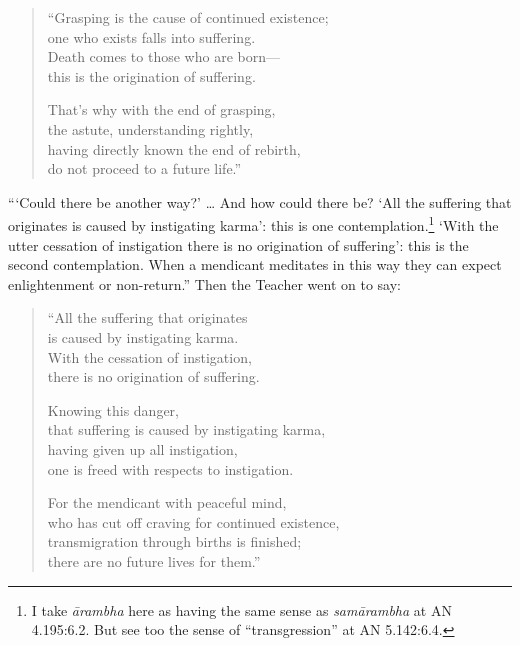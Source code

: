 \documentclass[12pt,openany]{book}%
\begin{document}
\begin{verse}%
“Grasping is the cause of continued existence; \\
one who exists falls into suffering. \\
Death comes to those who are born—\\
this is the origination of suffering. 

That’s why with the end of grasping, \\
the astute, understanding rightly, \\
having directly known the end of rebirth, \\
do not proceed to a future life.” 

%
\end{verse}

“‘Could there be another way?’ … And how could there be? ‘All the suffering that originates is caused by instigating karma’: this is one contemplation.\footnote{I take \textit{\textsanskrit{ārambha}} here as having the same sense as \textit{\textsanskrit{samārambha}} at AN 4.195:6.2. But see too the sense of “transgression” at AN 5.142:6.4. } ‘With the utter cessation of instigation there is no origination of suffering’: this is the second contemplation. When a mendicant meditates in this way they can expect enlightenment or non-return.” Then the Teacher went on to say: 

\begin{verse}%
“All the suffering that originates \\
is caused by instigating karma. \\
With the cessation of instigation, \\
there is no origination of suffering. 

Knowing this danger, \\
that suffering is caused by instigating karma, \\
having given up all instigation, \\
one is freed with respects to instigation. 

For the mendicant with peaceful mind, \\
who has cut off craving for continued existence, \\
transmigration through births is finished; \\
there are no future lives for them.” 

%
\end{verse}
\end{document}
